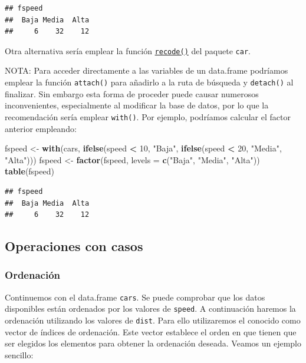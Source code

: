 \documentclass[
]{book}
\newenvironment{Shaded}{\begin{snugshade}}{\end{snugshade}}
\newcommand{\DataTypeTok}[1]{\textcolor[rgb]{0.13,0.29,0.53}{#1}}
\newcommand{\DecValTok}[1]{\textcolor[rgb]{0.00,0.00,0.81}{#1}}
\newcommand{\KeywordTok}[1]{\textcolor[rgb]{0.13,0.29,0.53}{\textbf{#1}}}
\newcommand{\NormalTok}[1]{#1}
\newcommand{\OperatorTok}[1]{\textcolor[rgb]{0.81,0.36,0.00}{\textbf{#1}}}
\newcommand{\StringTok}[1]{\textcolor[rgb]{0.31,0.60,0.02}{#1}}
\begin{document}
\begin{verbatim}
## fspeed
##  Baja Media  Alta 
##     6    32    12
\end{verbatim}

Otra alternativa sería emplear la función \href{https://www.rdocumentation.org/packages/car/versions/3.0-9/topics/recode}{\texttt{recode()}} del paquete \texttt{car}.

NOTA: Para acceder directamente a las variables de un data.frame podríamos emplear la función \texttt{attach()} para añadirlo a la ruta de búsqueda y \texttt{detach()} al finalizar.
Sin embargo esta forma de proceder puede causar numerosos inconvenientes, especialmente al modificar la base de datos, por lo que la recomendación sería emplear \texttt{with()}.
Por ejemplo, podríamos calcular el factor anterior empleando:

\begin{Shaded}
\begin{Highlighting}[]
\NormalTok{fspeed <-}\StringTok{ }\KeywordTok{with}\NormalTok{(cars, }\KeywordTok{ifelse}\NormalTok{(speed }\OperatorTok{<}\StringTok{ }\DecValTok{10}\NormalTok{, }\StringTok{"Baja"}\NormalTok{,}
                 \KeywordTok{ifelse}\NormalTok{(speed }\OperatorTok{<}\StringTok{ }\DecValTok{20}\NormalTok{, }\StringTok{"Media"}\NormalTok{, }\StringTok{"Alta"}\NormalTok{)))}
\NormalTok{fspeed <-}\StringTok{ }\KeywordTok{factor}\NormalTok{(fspeed, }\DataTypeTok{levels =} \KeywordTok{c}\NormalTok{(}\StringTok{"Baja"}\NormalTok{, }\StringTok{"Media"}\NormalTok{, }\StringTok{"Alta"}\NormalTok{))}
\KeywordTok{table}\NormalTok{(fspeed)}
\end{Highlighting}
\end{Shaded}

\begin{verbatim}
## fspeed
##  Baja Media  Alta 
##     6    32    12
\end{verbatim}

\hypertarget{operaciones-con-casos}{%
\subsection{Operaciones con casos}\label{operaciones-con-casos}}

\hypertarget{ordenaciuxf3n}{%
\subsubsection{Ordenación}\label{ordenaciuxf3n}}

Continuemos con el data.frame \texttt{cars}.
Se puede comprobar que los datos disponibles están ordenados por
los valores de \texttt{speed}. A continuación haremos la ordenación utilizando
los valores de \texttt{dist}. Para ello utilizaremos el conocido como vector de
índices de ordenación.
Este vector establece el orden en que tienen que ser elegidos los
elementos para obtener la ordenación deseada.
Veamos un ejemplo sencillo:
\end{document}
